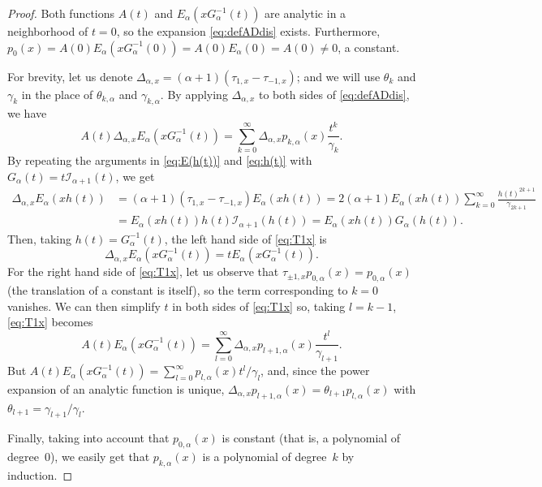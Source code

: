 \documentclass[11pt]{article}
\theoremstyle{plain}
\theoremstyle{remark}
\numberwithin{equation}{section} %
\newcommand{\Ea}{E_{\alpha}}
\newcommand{\I}{\mathcal{I}}
\newcommand{\cc}{\gamma}
\begin{document}
\begin{proof}
Both functions $A(t)$ and $\Ea(x G_{\alpha}^{-1}(t))$ are analytic in a neighborhood of $t=0$, so the expansion \eqref{eq:defADdis} exists. 
Furthermore, $p_0(x) = A(0) \Ea(x G_{\alpha}^{-1}(0)) = A(0) \Ea(0) = A(0) \ne 0$, a constant.

For brevity, let us denote $\Delta_{\alpha,x} = (\alpha+1)(\tau_{1,x}-\tau_{-1,x})$;
and we will use $\theta_k$ and $\cc_k$ in the place of $\theta_{k,\alpha}$ and $\cc_{k,\alpha}$. 
By applying $\Delta_{\alpha,x}$ to both sides of \eqref{eq:defADdis}, we have
\begin{equation}
\label{eq:T1x}
  A(t) \Delta_{\alpha,x} \Ea(xG_{\alpha}^{-1}(t)) 
  = \sum_{k=0}^{\infty} \Delta_{\alpha,x} p_{k,\alpha}(x) \frac{t^k}{\cc_k}.
\end{equation}
By repeating the arguments in \eqref{eq:E(h(t))} and \eqref{eq:h(t)} with $G_{\alpha}(t) = t\I_{\alpha+1}(t)$, we get 
\begin{align*}
  \Delta_{\alpha,x} \Ea(xh(t)) 
  &= (\alpha+1)(\tau_{1,x}-\tau_{-1,x}) \Ea(x h(t)) 
  = 2(\alpha+1) \Ea(x h(t))  \sum_{k=0}^{\infty} \frac{h(t)^{2k+1}}{\cc_{2k+1}} \\
  &= \Ea(x h(t)) h(t) \I_{\alpha+1}(h(t))
  = \Ea(x h(t)) G_{\alpha}(h(t)).
\end{align*}
Then, taking $h(t) = G_{\alpha}^{-1}(t)$, the left hand side of \eqref{eq:T1x} is
\[
  \Delta_{\alpha,x} \Ea(x G_{\alpha}^{-1}(t)) = t \Ea(x G_{\alpha}^{-1}(t)).
\]
For the right hand side of \eqref{eq:T1x}, let us observe that $\tau_{\pm1,x}p_{0,\alpha}(x) = p_{0,\alpha}(x)$ (the translation of a constant is itself), so the term corresponding to $k=0$ vanishes. We can then simplify $t$ in both sides of \eqref{eq:T1x} so, taking  $l=k-1$, \eqref{eq:T1x} becomes
\[
  A(t) \Ea(xG_{\alpha}^{-1}(t)) 
  = \sum_{l=0}^{\infty} \Delta_{\alpha,x}p_{l+1,\alpha}(x) \frac{t^l}{\cc_{l+1}}.
\]
But $A(t) \Ea(xG_{\alpha}^{-1}(t)) = \sum_{l=0}^{\infty} p_{l,\alpha}(x) t^l/\cc_{l}$, and, since the power expansion of an analytic function is unique, $\Delta_{\alpha,x}p_{l+1,\alpha}(x) = \theta_{l+1} p_{l,\alpha}(x)$ with $\theta_{l+1} = \cc_{l+1}/\cc_l$.

Finally, taking into account that $p_{0,\alpha}(x)$ is constant (that is, a polynomial of degree~$0$), we easily get that $p_{k,\alpha}(x)$ is a polynomial of degree~$k$ by induction.
\end{proof}

\end{document}

